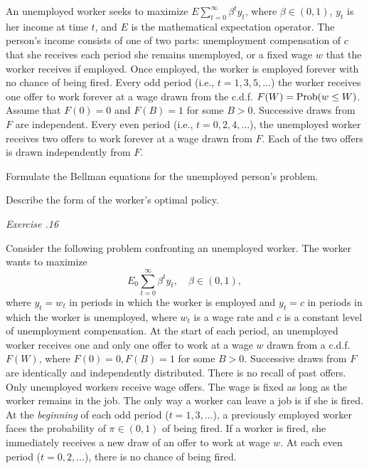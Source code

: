 \medskip
{} 
\medskip
\noindent
 An unemployed worker seeks
to maximize $E \sum_{t=0}^\infty \beta^t y_t$, where
$\beta \in (0,1)$, $y_t$ is her income at time $t$, and $E$ is
the mathematical expectation operator.  The person's
income consists of one of  two parts: unemployment compensation of
$c$ that she receives each period  she remains unemployed, or
a fixed wage $w$ that  the worker receives if employed. Once employed,
the worker is employed forever with no chance of being fired.
Every odd period (i.e., $t = 1, 3, 5, \ldots$) the worker
receives one offer to work  forever at a wage drawn from
the c.d.f. $F(W) = {\rm Prob} (w \leq W)$.  Assume that
$F(0) = 0$ and $F(B) = 1$ for some $B >0$. Successive
draws from $F$ are independent.  Every  even    period (i.e.,
$t=0, 2, 4, \ldots$),
the unemployed worker receives two offers to work forever
at a wage  drawn from $F$.   Each of the two offers is drawn
independently from $F$.


\medskip
{}  Formulate the Bellman equations for the unemployed
person's problem.

\medskip
{}  Describe the form of the worker's optimal
policy.


\medskip\noindent
{\it Exercise \the\chapternum.16} 

\medskip\noindent
  Consider the following problem
confronting an unemployed worker.  The worker wants
to maximize
$$ E_0 \sum_{t=0}^\infty \beta^t y_t, \quad \beta \in (0,1), $$
where $y_t = w_t$ in periods in which the worker is employed
and $y_t=c$ in periods in which the worker is unemployed, where
$w_t$ is a wage rate and $c$ is a constant level of unemployment
compensation.  At the start of  each period,
 an unemployed worker receives one and only
one offer to work at a wage $w$ drawn from
a c.d.f. $F(W)$, where $F(0) = 0, F(B) = 1$ for some
$B >0$.   Successive draws from $F$ are identically and
independently distributed.  There is no recall of past offers.
Only unemployed workers receive wage offers.  The wage is
fixed as long as the worker remains in the job.  The only
way a worker can leave a job is if she is fired.
  At the {\it beginning\/}
of each odd period ($t= 1, 3, \ldots$), a previously
employed worker faces the probability of $\pi \in (0,1)$
of being fired.  If a worker is fired,
she immediately receives a new draw of an offer to
work at wage $w$.      At each even period
($t=0, 2, \ldots$), there is no chance of being fired.

